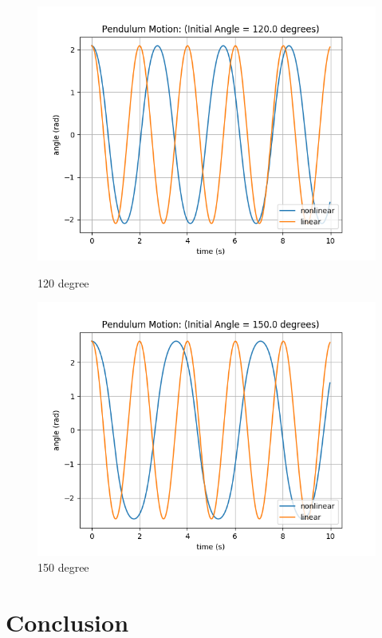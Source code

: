 \documentclass{article}
\begin{document}
\begin{figure}[h]
    \begin{minipage}{0.45\textwidth}
        \centering
        \includegraphics[width=1.2\textwidth]{Figure_120.png} %
        \caption{120 degree}
    \end{minipage}\hfill
    \begin{minipage}{0.45\textwidth}
        \centering
        \includegraphics[width=1.2\textwidth]{Figure_150.png} %
        \caption{150 degree}
    \end{minipage}
\end{figure}


\newpage
\section{Conclusion}
\end{document}
